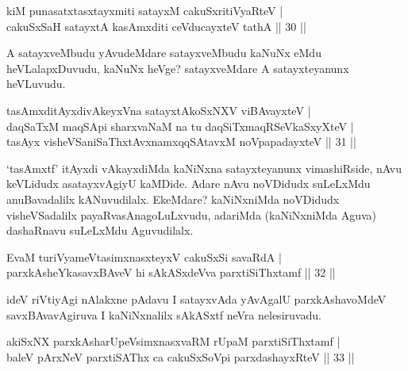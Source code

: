 
\begin{shl}
kiM punasatxtasxtayxmiti satayxM cakuSxritiVyaRteV | \\
cakuSxSaH satayxtA kasAmxditi ceVducayxteV tathA \hfill ||  30 || 
\end{shl}

\begin{artha} 
A satayxveMbudu yAvudeMdare satayxveMbudu kaNuNx eMdu heVLalapxDuvudu, 
kaNuNx heVge? satayxveMdare A satayxteyanunx heVLuvudu.
\end{artha}

\begin{shl}
tasAmxditAyxdivAkeyxVna satayxtA\s koSxNXV viBAvayxteV | \\
daqSaTxM maqSA\s pi sharxvaNaM na tu daqSiTxmaqRSeVkaSxyXteV | \\
tasAyx visheVSaniSaThxtAvxnamxqqSAtavxM noVpapadayxteV \hfill ||  31 || 
\end{shl}

\begin{artha} 
`tasAmxtf' itAyxdi vAkayxdiMda kaNiNxna satayxteyanunx vimashiRside, 
nAvu keVLidudx asatayxvAgiyU kaMDide. Adare nAvu noVDidudx suLeLxMdu 
anuBavadalilx kANuvudilalx. EkeMdare? kaNiNxniMda noVDidudx 
visheVSadalilx payaRvasAnagoLuLxvudu, adariMda (kaNiNxniMda Aguva) 
dashaRnavu suLeLxMdu Aguvudilalx.
\end{artha}


\begin{shl}
EvaM turiVyameVtasimxnasxteyxV cakuSxSi savaRdA | \\
parxkAsheYkasavxBAveV hi sAkASxdeVva parxtiSiThxtamf \hfill ||  32 || 
\end{shl}

\begin{artha} 
ideV riVtiyAgi nAlakxne pAdavu I satayxvAda yAvAgalU parxkAshavoMdeV
savxBAvavAgiruva I kaNiNxnalilx sAkASxtf neVra nelesiruvadu.
\end{artha}


\begin{shl}
akiSxNX parxkAsharUpeV\s simxnasxvaRM rUpaM parxtiSiThxtamf | \\
baleV pArxNeV parxtiSAThx ca cakuSxSoV\s pi parxdashayxRteV \hfill ||  33 || 
\end{shl}

